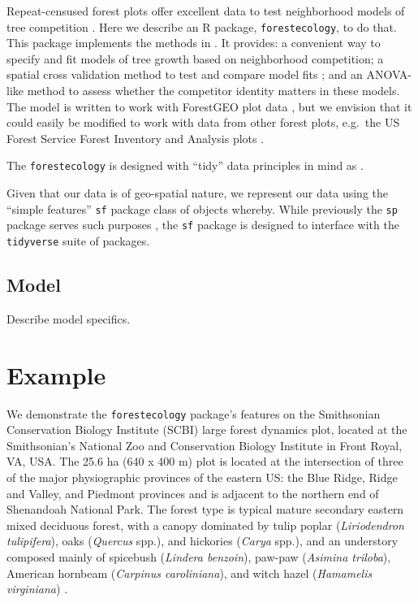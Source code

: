 \documentclass[12pt]{article}
\begin{document}
Repeat-censused forest plots offer excellent data to test neighborhood
models of tree competition \citet{allen_permutation_2020}
\citet{canham_neighborhood_2006} \citet{uriarte_spatially_2004}. Here we
describe an R package, \texttt{forestecology}, to do that. This package
implements the methods in \citet{allen_permutation_2020}. It provides: a
convenient way to specify and fit models of tree growth based on
neighborhood competition; a spatial cross validation method to test and
compare model fits \citet{roberts_cross-validation_2017}; and an
ANOVA-like method to assess whether the competitor identity matters in
these models. The model is written to work with ForestGEO plot data
\citet{andersonteixeira_ctfs-forestgeo_2015}, but we envision that it
could easily be modified to work with data from other forest plots,
e.g.~the US Forest Service Forest Inventory and Analysis plots
\citet{smith_forest_2002}.

The \texttt{forestecology} is designed with ``tidy'' data principles in
mind as \citet{wickham_welcome_2019}.

Given that our data is of geo-spatial nature, we represent our data
using the ``simple features'' \texttt{sf} package class of objects
\citet{pebesma_simple_2018} whereby. While previously the \texttt{sp}
package serves such purposes \citet{pebesma_sp_2005}, the \texttt{sf}
package is designed to interface with the \texttt{tidyverse} suite of
packages.

\hypertarget{model}{%
\subsection{Model}\label{model}}

Describe model specifics.

\hypertarget{example}{%
\section{Example}\label{example}}

We demonstrate the \texttt{forestecology} package's features on the
Smithsonian Conservation Biology Institute (SCBI) large forest dynamics
plot, located at the Smithsonian's National Zoo and Conservation Biology
Institute in Front Royal, VA, USA. The 25.6 ha (640 x 400 m) plot is
located at the intersection of three of the major physiographic
provinces of the eastern US: the Blue Ridge, Ridge and Valley, and
Piedmont provinces and is adjacent to the northern end of Shenandoah
National Park. The forest type is typical mature secondary eastern mixed
deciduous forest, with a canopy dominated by tulip poplar
(\emph{Liriodendron tulipifera}), oaks (\emph{Quercus} spp.), and
hickories (\emph{Carya} spp.), and an understory composed mainly of
spicebush (\emph{Lindera benzoin}), paw-paw (\emph{Asimina triloba}),
American hornbeam (\emph{Carpinus caroliniana}), and witch hazel
(\emph{Hamamelis virginiana}) \citet{bourg_initial_2013}.
\end{document}

